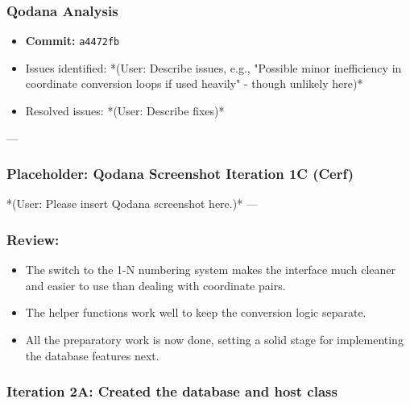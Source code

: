\subsubsection{Qodana Analysis}
\begin{itemize}
	\item \textbf{Commit:} \verb|a4472fb|
	\item Issues identified: *(User: Describe issues, e.g., "Possible minor inefficiency in coordinate conversion loops if used heavily" - though unlikely here)*
	\item Resolved issues: *(User: Describe fixes)*
\end{itemize}

--- %
\subsubsection*{Placeholder: Qodana Screenshot Iteration 1C (Cerf)}
*(User: Please insert Qodana screenshot here.)*
---

\subsubsection{Review:}
\begin{itemize}
	\item The switch to the 1-N numbering system makes the interface much cleaner and easier to use than dealing with coordinate pairs.
	\item The helper functions work well to keep the conversion logic separate.
	\item All the preparatory work is now done, setting a solid stage for implementing the database features next.
\end{itemize}

\newpage

\subsubsection{Iteration 2A: Created the database and host class}

